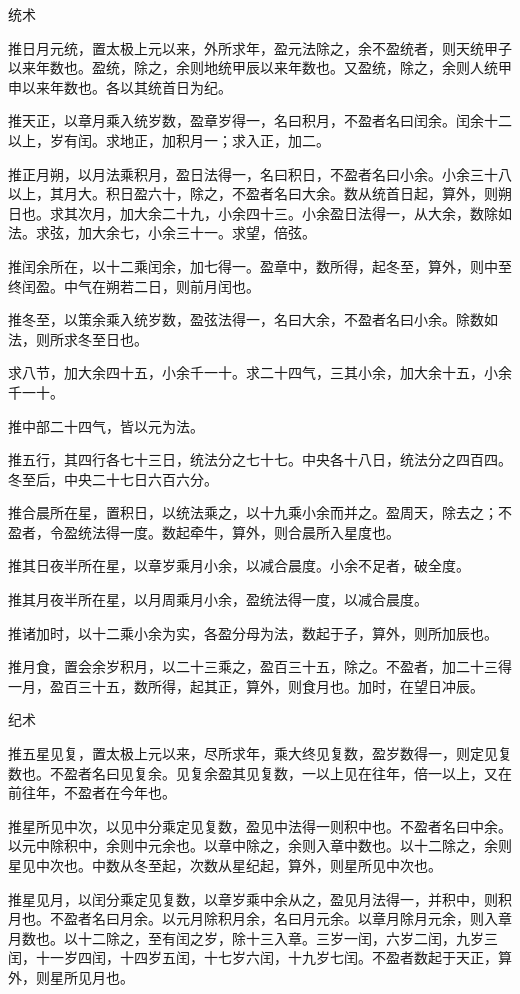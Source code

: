 \documentclass[]{article}
\begin{document}
统术

推日月元统，置太极上元以来，外所求年，盈元法除之，余不盈统者，则天统甲子以来年数也。盈统，除之，余则地统甲辰以来年数也。又盈统，除之，余则人统甲申以来年数也。各以其统首日为纪。

推天正，以章月乘入统岁数，盈章岁得一，名曰积月，不盈者名曰闰余。闰余十二以上，岁有闰。求地正，加积月一；求入正，加二。

推正月朔，以月法乘积月，盈日法得一，名曰积日，不盈者名曰小余。小余三十八以上，其月大。积日盈六十，除之，不盈者名曰大余。数从统首日起，算外，则朔日也。求其次月，加大余二十九，小余四十三。小余盈日法得一，从大余，数除如法。求弦，加大余七，小余三十一。求望，倍弦。

推闰余所在，以十二乘闰余，加七得一。盈章中，数所得，起冬至，算外，则中至终闰盈。中气在朔若二日，则前月闰也。

推冬至，以策余乘入统岁数，盈弦法得一，名曰大余，不盈者名曰小余。除数如法，则所求冬至日也。

求八节，加大余四十五，小余千一十。求二十四气，三其小余，加大余十五，小余千一十。

推中部二十四气，皆以元为法。

推五行，其四行各七十三日，统法分之七十七。中央各十八日，统法分之四百四。冬至后，中央二十七日六百六分。

推合晨所在星，置积日，以统法乘之，以十九乘小余而并之。盈周天，除去之；不盈者，令盈统法得一度。数起牵牛，算外，则合晨所入星度也。

推其日夜半所在星，以章岁乘月小余，以减合晨度。小余不足者，破全度。

推其月夜半所在星，以月周乘月小余，盈统法得一度，以减合晨度。

推诸加时，以十二乘小余为实，各盈分母为法，数起于子，算外，则所加辰也。

推月食，置会余岁积月，以二十三乘之，盈百三十五，除之。不盈者，加二十三得一月，盈百三十五，数所得，起其正，算外，则食月也。加时，在望日冲辰。

纪术

推五星见复，置太极上元以来，尽所求年，乘大终见复数，盈岁数得一，则定见复数也。不盈者名曰见复余。见复余盈其见复数，一以上见在往年，倍一以上，又在前往年，不盈者在今年也。

推星所见中次，以见中分乘定见复数，盈见中法得一则积中也。不盈者名曰中余。以元中除积中，余则中元余也。以章中除之，余则入章中数也。以十二除之，余则星见中次也。中数从冬至起，次数从星纪起，算外，则星所见中次也。

推星见月，以闰分乘定见复数，以章岁乘中余从之，盈见月法得一，并积中，则积月也。不盈者名曰月余。以元月除积月余，名曰月元余。以章月除月元余，则入章月数也。以十二除之，至有闰之岁，除十三入章。三岁一闰，六岁二闰，九岁三闰，十一岁四闰，十四岁五闰，十七岁六闰，十九岁七闰。不盈者数起于天正，算外，则星所见月也。
\end{document}
